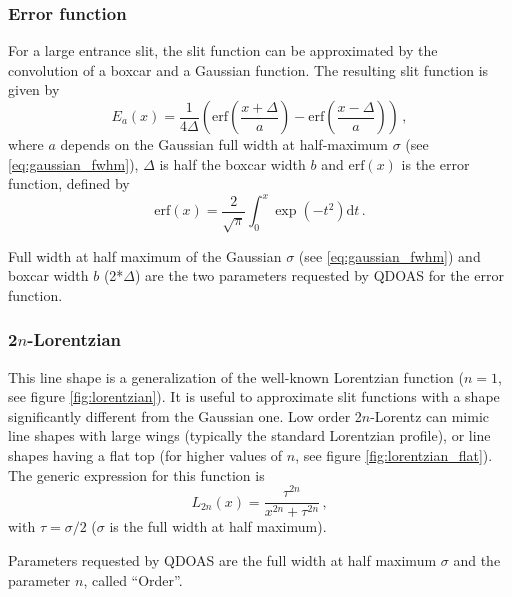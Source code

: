 \subsubsection{Error function}
For a large entrance slit, the slit function can be approximated by
the convolution of a boxcar and a Gaussian function.  The resulting
slit function is given by
\begin{equation}
  \label{eq:error_function_slit}
  E_a(x) = \frac{1}{4\Delta}\left(
    \mathrm{erf}\left(\frac{x+\Delta}{a}\right) - \mathrm{erf}\left(\frac{x-\Delta}{a}\right) \right)\, ,
\end{equation}
where $a$ depends on the Gaussian full width at half-maximum $\sigma$ (see \ref{eq:gaussian_fwhm}),
$\Delta$ is half the boxcar width $b$ and $\mathrm{erf}(x)$ is the
error function, defined by
\begin{equation}
  \label{eq:error_function}
  \mathrm{erf}(x) = \frac{2}{\sqrt{\pi}}\int_0^x \exp(-t^2)\mathrm{d}t\,.
\end{equation}

Full width at half maximum of the Gaussian $\sigma$ (see
\ref{eq:gaussian_fwhm}) and boxcar width $b$ (2*$\Delta$) are the two
parameters requested by QDOAS for the error function.

\subsubsection{2$n$-Lorentzian}
This line shape is a generalization of the well-known Lorentzian
function ($n=1$, see figure \ref{fig:lorentzian}).  It is useful to
approximate slit functions with a shape significantly different from
the Gaussian one. Low order 2$n$-Lorentz can mimic line shapes with
large wings (typically the standard Lorentzian profile), or line
shapes having a flat top (for higher values of $n$, see figure
\ref{fig:lorentzian_flat}). The generic expression for this function
is
\begin{equation}
  \label{eq:2nlorentz}
  L_{2n}(x) = \frac{\tau^{2n}}{x^{2n}+\tau^{2n}}\,,
\end{equation}
with $\tau=\sigma/2$ ($\sigma$ is the full width at half maximum).

Parameters requested by QDOAS are the full width at half maximum
$\sigma$ and the parameter $n$, called ``Order''.

